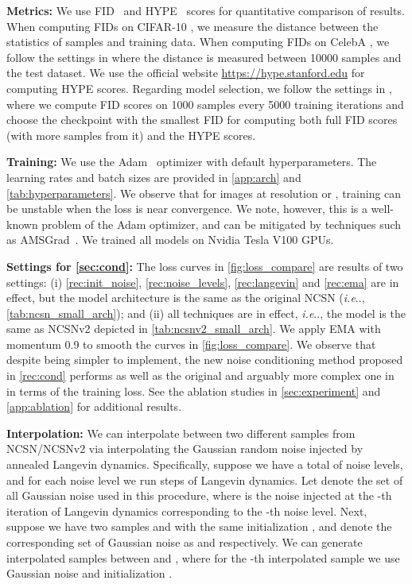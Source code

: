 \documentclass{article}
\makeatletter
\def\@onedot{\ifx\@let@token.\else.\null\fi\xspace}
\DeclareRobustCommand\onedot{\futurelet\@let@token\@onedot}
\def\ie{\emph{i.e}\onedot}
\makeatother
\begin{document}
\textbf{Metrics:} We use FID~\cite{heusel2017gans} and HYPE~\cite{zhou2019hype} scores for quantitative comparison of results. When computing FIDs on CIFAR-10 , we measure the distance between the statistics of samples and training data. When computing FIDs on CelebA , we follow the settings in \cite{song2019bridging} where the distance is measured between 10000 samples and the test dataset. We use the official website \href{https://hype.stanford.edu}{https://hype.stanford.edu} for computing HYPE scores. Regarding model selection, we follow the settings in \cite{song2019generative}, where we compute FID scores on 1000 samples every 5000 training iterations and choose the checkpoint with the smallest FID for computing both full FID scores (with more samples from it) and the HYPE scores.

\textbf{Training:} We use the Adam~\cite{kingma2014adam} optimizer with default hyperparameters. The learning rates and batch sizes are provided in \cref{app:arch} and \cref{tab:hyperparameters}. We observe that for images at resolution  or , training can be unstable when the loss is near convergence. We note, however, this is a well-known problem of the Adam optimizer, and can be mitigated by techniques such as AMSGrad~\cite{reddi2019convergence}. We trained all models on Nvidia Tesla V100 GPUs.

\textbf{Settings for \cref{sec:cond}:}
The loss curves in \cref{fig:loss_compare} are results of two settings: (i) \cref{rec:init_noise}, \ref{rec:noise_levels}, \ref{rec:langevin} and \ref{rec:ema} are in effect, but the model architecture is the same as the original NCSN (\ie, \cref{tab:ncsn_small_arch}); and (ii) all techniques are in effect, \ie, the model is the same as NCSNv2 depicted in \cref{tab:ncsnv2_small_arch}. We apply EMA with momentum 0.9 to smooth the curves in \cref{fig:loss_compare}. We observe that despite being simpler to implement, the new noise conditioning method proposed in \cref{rec:cond} performs as well as the original and arguably more complex one in \cite{song2019generative} in terms of the training loss. See the ablation studies in \cref{sec:experiment} and \cref{app:ablation} for additional results.

\textbf{Interpolation:} We can interpolate between two different samples from NCSN/NCSNv2 via interpolating the Gaussian random noise injected by annealed Langevin dynamics. Specifically, suppose we have a total of  noise levels, and for each noise level we run  steps of Langevin dynamics. Let  denote the set of all Gaussian noise used in this procedure, where  is the noise injected at the -th iteration of Langevin dynamics corresponding to the -th noise level. Next, suppose we have two samples  and  with the same initialization , and denote the corresponding set of Gaussian noise as  and  respectively. We can generate  interpolated samples between  and , where for the -th interpolated sample we use Gaussian noise  and initialization .
\end{document}
